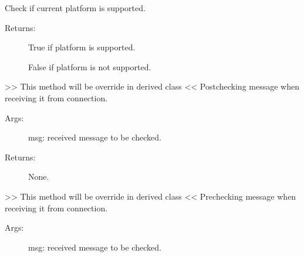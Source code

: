 \documentclass[letterpaper,10pt,english]{sphinxmanual}
\begin{document}
\begin{fulllineitems}
\begin{fulllineitems}
\label{\detokenize{QConnectionLibrary:QConnectionLibrary.connection_base.ConnectionBase.is_supported_platform}}
\sphinxAtStartPar
Check if current platform is supported.
\begin{description}
\item[{Returns:}] \leavevmode
\sphinxAtStartPar
True if platform is supported.

\sphinxAtStartPar
False if platform is not supported.

\end{description}

\end{fulllineitems}


\begin{fulllineitems}
\label{\detokenize{QConnectionLibrary:QConnectionLibrary.connection_base.ConnectionBase.post_msg_check}}
\sphinxAtStartPar
\textgreater{}\textgreater{} This method will be override in derived class \textless{}\textless{}
Post\sphinxhyphen{}checking message when receiving it from connection.
\begin{description}
\item[{Args:}] \leavevmode
\sphinxAtStartPar
msg: received message to be checked.

\item[{Returns:}] \leavevmode
\sphinxAtStartPar
None.

\end{description}

\end{fulllineitems}


\begin{fulllineitems}
\label{\detokenize{QConnectionLibrary:QConnectionLibrary.connection_base.ConnectionBase.pre_msg_check}}
\sphinxAtStartPar
\textgreater{}\textgreater{} This method will be override in derived class \textless{}\textless{}
Pre\sphinxhyphen{}checking message when receiving it from connection.
\begin{description}
\item[{Args:}] \leavevmode
\sphinxAtStartPar
msg: received message to be checked.


\end{description}
\end{fulllineitems}
\end{fulllineitems}
\end{document}

